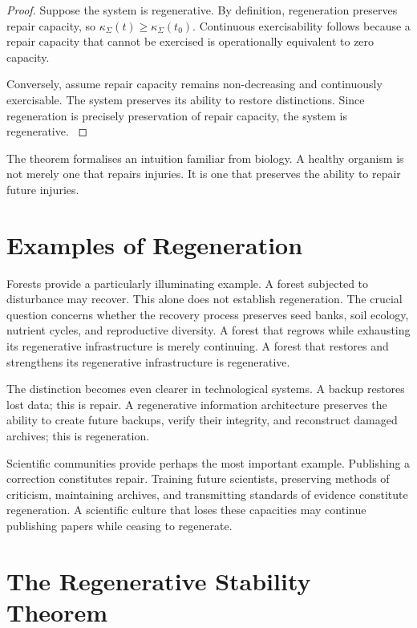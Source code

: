 \documentclass[12pt,twoside,openright]{book}
\newcounter{exercise}[chapter]
\begin{document}
\begin{proof}
  Suppose the system is regenerative. By definition,
  regeneration preserves repair capacity, so
  $\kappa_\Sigma(t)\ge\kappa_\Sigma(t_0)$. Continuous
  exercisability follows because a repair capacity that
  cannot be exercised is operationally equivalent to zero
  capacity.

  Conversely, assume repair capacity remains non-decreasing
  and continuously exercisable. The system preserves its
  ability to restore distinctions. Since regeneration is
  precisely preservation of repair capacity, the system is
  regenerative. \parencite{holling1973,gunderson2002}
\end{proof}

The theorem formalises an intuition familiar from biology.
A healthy organism is not merely one that repairs injuries.
It is one that preserves the ability to repair future
injuries.

\section{Examples of Regeneration}
\label{sec:ch11-examples}

Forests provide a particularly illuminating example. A
forest subjected to disturbance may recover. This alone does
not establish regeneration. The crucial question concerns
whether the recovery process preserves seed banks, soil
ecology, nutrient cycles, and reproductive diversity. A
forest that regrows while exhausting its regenerative
infrastructure is merely continuing. A forest that restores
and strengthens its regenerative infrastructure is
regenerative.

The distinction becomes even clearer in technological
systems. A backup restores lost data; this is repair. A
regenerative information architecture preserves the ability
to create future backups, verify their integrity, and
reconstruct damaged archives; this is regeneration.

Scientific communities provide perhaps the most important
example. Publishing a correction constitutes repair.
Training future scientists, preserving methods of
criticism, maintaining archives, and transmitting standards
of evidence constitute regeneration. A scientific culture
that loses these capacities may continue publishing papers
while ceasing to regenerate.

\section{The Regenerative Stability Theorem}
\label{sec:ch11-stability}
\end{document}

